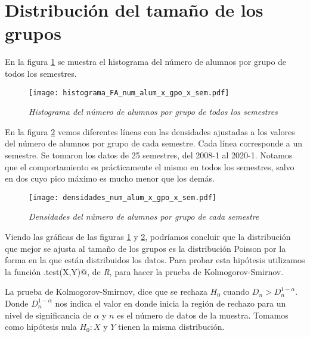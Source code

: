 \section{Distribución del tamaño de los grupos} \label{DitribTamGpos}
En la figura \ref{histNumAl_x_gpo_x_sem} se muestra el histograma del número de alumnos por grupo de todos los semestres. %

\begin{figure}[H]
\centering
\texttt{[image: histograma\_FA\_num\_alum\_x\_gpo\_x\_sem.pdf]} %
\caption{\textit{Histograma del número de alumnos por grupo de todos los semestres}}\label{histNumAl_x_gpo_x_sem}
\end{figure}


En la figura \ref{densidadesNumAl_x_gpo_x_sem} vemos diferentes líneas con las densidades ajustadas a los valores del número de alumnos por grupo de cada semestre. Cada línea corresponde a un semestre. Se tomaron los datos de 25 semestres, del 2008-1 al 2020-1. Notamos que el comportamiento es prácticamente el mismo en todos los semestres, salvo en dos cuyo pico máximo es mucho menor que los demás. 

\begin{figure}[H]
\centering
\texttt{[image: densidades\_num\_alum\_x\_gpo\_x\_sem.pdf]} %
\caption{\textit{Densidades del número de alumnos por grupo de cada semestre}}\label{densidadesNumAl_x_gpo_x_sem}
\end{figure}

Viendo las gráficas de las figuras \ref{histNumAl_x_gpo_x_sem} y \ref{densidadesNumAl_x_gpo_x_sem}, podríamos concluir que la distribución que mejor se ajusta al tamaño de los grupos es la distribución Poisson por la forma en la que están distribuidos los datos. Para probar esta hipótesis utilizamos la función \verb@ks.test(X,Y)@, de \textit{R}, para hacer la prueba de Kolmogorov-Smirnov.

La prueba de Kolmogorov-Smirnov, dice que se rechaza $H_{0}$ cuando $D_{n} > D_{n}^{1-\alpha}$. Donde $D_{n}^{1-\alpha}$ nos indica el valor en donde inicia la región de rechazo para un nivel de significancia de $\alpha$ y $n$ es el número de datos de la muestra. Tomamos como hipótesis nula $H_{0}: X$ y $Y$ tienen la misma distribución.

